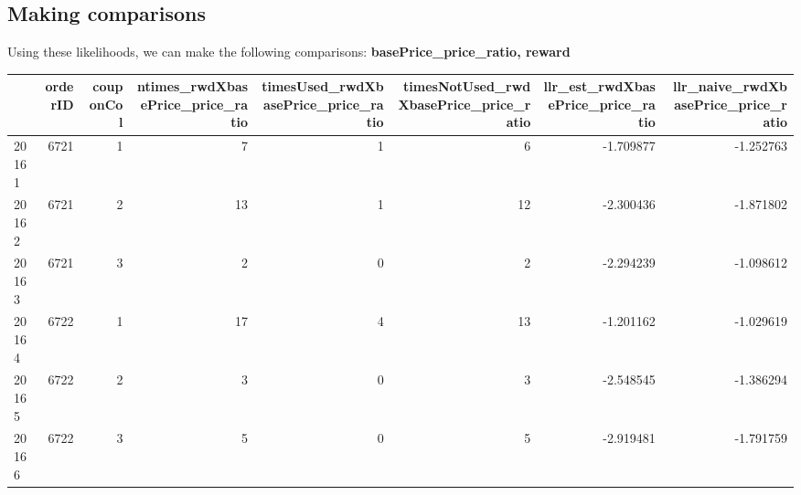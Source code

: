 \documentclass[10pt]{report}
\newenvironment{Shaded}{}{}
\newcommand{\KeywordTok}[1]{\textcolor[rgb]{0.00,0.44,0.13}{\textbf{{#1}}}}
\newcommand{\DataTypeTok}[1]{\textcolor[rgb]{0.56,0.13,0.00}{{#1}}}
\newcommand{\StringTok}[1]{\textcolor[rgb]{0.25,0.44,0.63}{{#1}}}
\newcommand{\CommentTok}[1]{\textcolor[rgb]{0.38,0.63,0.69}{\textit{{#1}}}}
\newcommand{\NormalTok}[1]{{#1}}
\begin{document}
\subsection{Making comparisons}\label{making-comparisons}

Using these likelihoods, we can make the following comparisons:
\textbf{basePrice\_price\_ratio, reward}

\begin{Shaded}
\end{Shaded}

\begin{longtable}[c]{@{}lrrrrrrr@{}}
\toprule
& orderID & couponCol & ntimes\_rwdXbasePrice\_price\_ratio &
timesUsed\_rwdXbasePrice\_price\_ratio &
timesNotUsed\_rwdXbasePrice\_price\_ratio &
llr\_est\_rwdXbasePrice\_price\_ratio &
llr\_naive\_rwdXbasePrice\_price\_ratio\tabularnewline
\midrule
\endhead
20161 & 6721 & 1 & 7 & 1 & 6 & -1.709877 & -1.252763\tabularnewline
20162 & 6721 & 2 & 13 & 1 & 12 & -2.300436 & -1.871802\tabularnewline
20163 & 6721 & 3 & 2 & 0 & 2 & -2.294239 & -1.098612\tabularnewline
20164 & 6722 & 1 & 17 & 4 & 13 & -1.201162 & -1.029619\tabularnewline
20165 & 6722 & 2 & 3 & 0 & 3 & -2.548545 & -1.386294\tabularnewline
20166 & 6722 & 3 & 5 & 0 & 5 & -2.919481 & -1.791759\tabularnewline
\bottomrule
\end{longtable}
\end{document}
